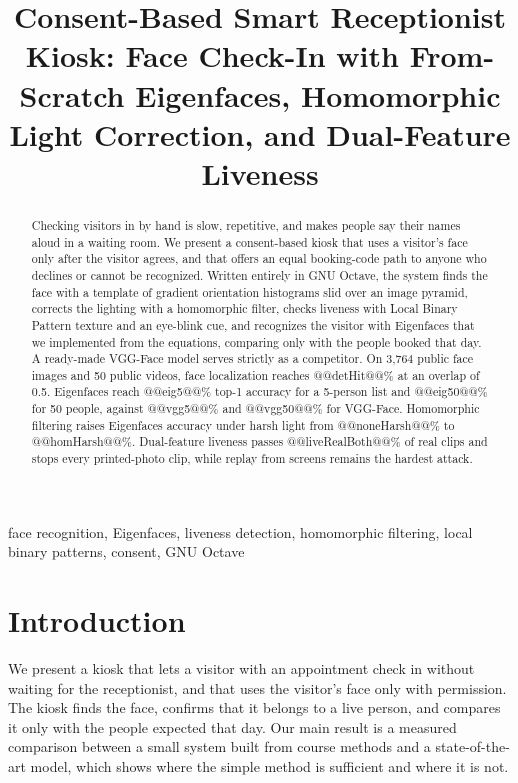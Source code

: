 \documentclass[conference,a4paper]{IEEEtran}
\begin{document}
\title{Consent-Based Smart Receptionist Kiosk: Face Check-In with From-Scratch Eigenfaces, Homomorphic Light Correction, and Dual-Feature Liveness}

\author{
}

\maketitle

\begin{abstract}
Checking visitors in by hand is slow, repetitive, and makes people say their names aloud in a waiting room. We present a consent-based kiosk that uses a visitor's face only after the visitor agrees, and that offers an equal booking-code path to anyone who declines or cannot be recognized. Written entirely in GNU Octave, the system finds the face with a template of gradient orientation histograms slid over an image pyramid, corrects the lighting with a homomorphic filter, checks liveness with Local Binary Pattern texture and an eye-blink cue, and recognizes the visitor with Eigenfaces that we implemented from the equations, comparing only with the people booked that day. A ready-made VGG-Face model serves strictly as a competitor. On 3,764 public face images and 50 public videos, face localization reaches @@detHit@@\% at an overlap of 0.5. Eigenfaces reach @@eig5@@\% top-1 accuracy for a 5-person list and @@eig50@@\% for 50 people, against @@vgg5@@\% and @@vgg50@@\% for VGG-Face. Homomorphic filtering raises Eigenfaces accuracy under harsh light from @@noneHarsh@@\% to @@homHarsh@@\%. Dual-feature liveness passes @@liveRealBoth@@\% of real clips and stops every printed-photo clip, while replay from screens remains the hardest attack.
\end{abstract}

\begin{IEEEkeywords}
face recognition, Eigenfaces, liveness detection, homomorphic filtering, local binary patterns, consent, GNU Octave
\end{IEEEkeywords}

\section{Introduction}
We present a kiosk that lets a visitor with an appointment check in without waiting for the receptionist, and that uses the visitor's face only with permission. The kiosk finds the face, confirms that it belongs to a live person, and compares it only with the people expected that day. Our main result is a measured comparison between a small system built from course methods and a state-of-the-art model, which shows where the simple method is sufficient and where it is not.
\end{document}
